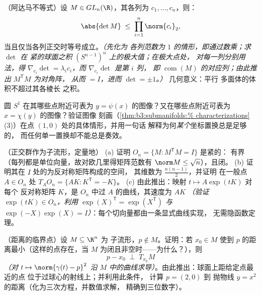 \begin{exercise}[$\star\star\star$]\label{exo:b3:submanifolds:9}
（阿达马不等式）设 $M \in GL_n(\R)$，其各列为
$c_1, \dots, c_n$，则：
\[
\abs{\det M} \;\leq\; \prod_{i=1}^n\norm{c_i}_2 ,
\]
当且仅当各列正交时等号成立。\emph{（先化为
各列范数为 $1$ 的情形，即通过数乘；求 $\det$ 在
紧的球面之积 $(S^{n-1})^n$ 上的极大值；在极大点处，
对每一列分别用法，得 $\nabla_{c_i}\det =
\lambda_ic_i$，而 $\nabla_{c_i}\det$ 是第 $i$ 列，
即 $\operatorname{com}(M)$ 的对应列；由此推出 $M^{\mathsf T}M$ 为对角阵，
从而 $= I$，进而 $\det = \pm1$。）} 几何意义：平行
多面体的体积不超过其各棱长
之积。
\end{exercise}

\begin{exercise}[$\star\star$]\label{exo:b3:submanifolds:10}
圆 $S^1$ 在其哪些点附近可表为 $y =
\psi(x)$ 的图像？又在哪些点附近可表为 $x = \chi(y)$ 的图像？验证图像
刻画（\cref{thm:b3:submanifolds:%
characterizations}(3)）在点 $(1, 0)$ 处的具体情形，并用一句话
解释为何\emph{某个}坐标置换总是足够的，
而任何单一置换却不能总是奏效。
\end{exercise}

\begin{exercise}[$\star\star$]\label{exo:b3:submanifolds:11}
（正交群作为子流形，定量地）
(a) 证明 $O_n = \{M : M^{\mathsf T}M = I\}$ 是紧的：
有界（每列都是单位向量，故对欧几里得矩阵范数有 $\norm M \leq
\sqrt n$），且闭。
(b) 证明其在 $I$ 处的为反对称矩阵构成的空间，
其维数为 $\frac{n(n-1)}2$，并证明
在一般点 $A \in O_n$ 处 $T_AO_n = \{AK : K^{\mathsf T} =
-K\}$。
(c) 由此推出：映射 $t \mapsto A\exp(tK)$ 对每个
反对称矩阵 $K$，是 $O_n$ 中过 $A$ 的曲线，其速度为 $AK$ \emph{（验证
$\exp(tK) \in O_n$，利用
$\exp(X)^{\mathsf T} = \exp(X^{\mathsf T})$ 与
$\exp(-X)\exp(X) = I$）}：每个切向量都由一条显式曲线实现，
无需隐函数定理。
\end{exercise}

\begin{exercise}[$\star\star$]\label{exo:b3:submanifolds:12}
（距离的临界点）设 $M \subseteq \R^n$ 为
子流形，$p \notin M$。证明：若 $x_0 \in M$
使到 $p$ 的距离最小（这样的点存在，当 $M$
为闭且非空时——为什么？），则
\[
p - x_0 \;\perp\; T_{x_0}M
\]
\emph{（对 $t \mapsto \norm{\gamma(t) - p}^2$ 沿
$M$ 中的曲线求导）}。由此推出：球面上距给定点最近的点
位于过球心的射线上；并利用此条件，
计算 $p = (2, 0)$ 到
抛物线 $y = x^2$ 的距离（化为三次方程，并数值求解，
精确到三位数字）。
\end{exercise}

